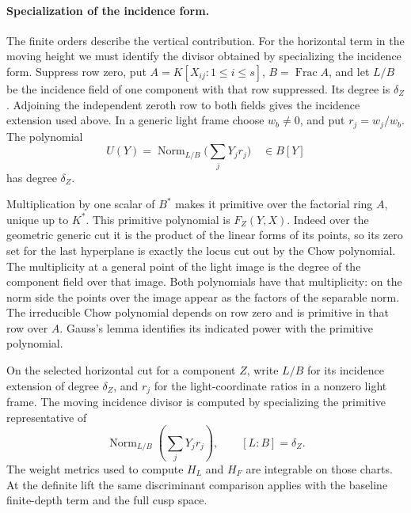 \paragraph{Specialization of the incidence form.}
\hypertarget{source-slice-integrals}{}
The finite orders describe the vertical contribution. For the horizontal term in the moving height we must identify the divisor obtained by specializing the incidence form. Suppress row zero, put \(A=K[X_{ij}:1\le i\le s]\),
\(B=\operatorname{Frac} A\), and let \(L/B\) be the incidence
field of one component with that row suppressed. Its degree
is \(\delta_Z\). Adjoining the independent zeroth row to
both fields gives the incidence extension used above. In a
generic light frame choose \(w_b\ne0\), and put \(r_j=w_j/w_b\).
The polynomial
\[
       U(Y)=\operatorname{Norm}_{L/B}\big(\sum_j Y_jr_j\big)
             \quad\in B[Y]
\]
has degree \(\delta_Z\).

Multiplication by one scalar of \(B^*\)
makes it primitive over the factorial ring \(A\), unique up
to \(K^*\). This primitive polynomial is \(F_Z(Y,X)\).
Indeed over the geometric generic cut it is the product of
the linear forms of its points, so its zero set for the last
hyperplane is exactly the locus cut out by the Chow polynomial.
The multiplicity at a general point of the light image is
the degree of the component field over that image. Both
polynomials have that multiplicity: on the norm side the
points over the image appear as the factors of the separable
norm. The irreducible Chow polynomial depends on row zero
and is primitive in that row over \(A\). Gauss's lemma
identifies its indicated power with the primitive polynomial.

\begin{proposition}
\label{prop:integrable-incidence-heights}
On the selected horizontal cut for a component \(Z\), write \(L/B\) for its incidence extension of degree \(\delta_Z\), and \(r_j\) for the light-coordinate ratios in a nonzero light frame. The moving incidence divisor is computed by specializing the primitive representative of
\[
 \operatorname{Norm}_{L/B}\!\left(\sum_j Y_jr_j\right),\qquad [L:B]=\delta_Z.
\]
 The weight metrics
used to compute \(H_L\) and \(H_F\) are integrable on those charts.
At the definite lift the same discriminant comparison applies with
the baseline finite-depth term and the full cusp space.
\end{proposition}

